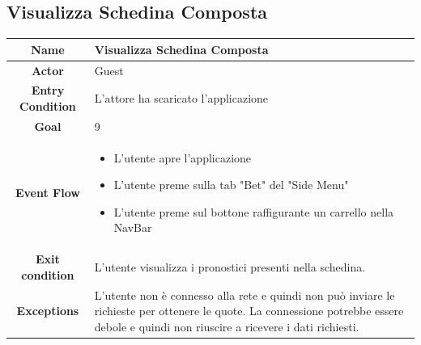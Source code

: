 \documentclass[numbers=noenddot, 12pt, a4paper, oneside]{scrbook}
\begin{document}
\subsection*{Visualizza Schedina Composta}
\begin{tabular}{|c|p{}|}
	\hline
	\parbox[c][6ex]{6ex}{\centering \textbf{Name}} & Visualizza Schedina Composta\\
	\hline
	\parbox[c][6ex]{6ex}{\centering \textbf{Actor}} & Guest \\
	\hline
	\parbox[c][10ex]{15ex}{\centering \textbf{Entry Condition}} & L'attore ha scaricato l'applicazione\\
	\hline
	\parbox[c][6ex]{15ex}{\centering \textbf{Goal}} &  9\\
	\hline
	\parbox[c][10ex]{12ex}{\centering \textbf{Event Flow}} & \begin{itemize}
		\item L'utente apre l'applicazione
		\item L'utente preme sulla tab "Bet" del "Side Menu"
		\item L'utente preme sul bottone raffigurante un carrello nella NavBar
	\end{itemize}\\
	\hline
	\parbox[c][7ex]{12ex}{\centering \textbf{Exit condition}} & L'utente visualizza i pronostici presenti nella schedina.\\\hline
	\parbox[c][10ex]{13ex}{\centering \textbf{Exceptions}} & L'utente non è connesso alla rete e quindi non può inviare le richieste per ottenere le quote. La connessione potrebbe essere debole e quindi non riuscire a ricevere i dati richiesti. \\ \hline	
\end{tabular}
\newpage
\end{document}
